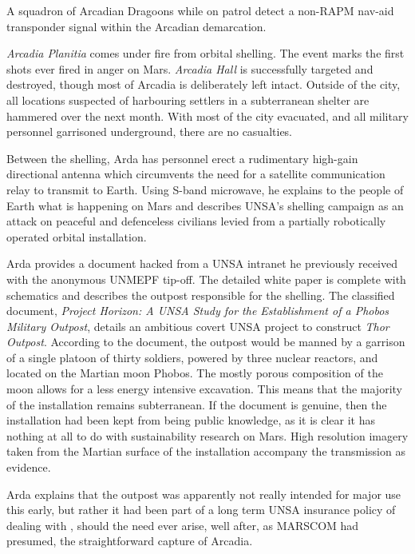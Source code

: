 

A squadron of Arcadian Dragoons while on patrol detect a non-RAPM nav-aid transponder signal within the Arcadian demarcation.
\StopTimelineDate

{\it Arcadia Planitia} comes under fire from orbital shelling. The event marks the first shots ever fired in anger on Mars. {\it Arcadia Hall} is successfully targeted and destroyed, though most of Arcadia is deliberately left intact. Outside of the city, all locations suspected of harbouring settlers in a subterranean shelter are hammered over the next month. With most of the city evacuated, and all military personnel garrisoned underground, there are no casualties.

Between the shelling, Arda has personnel erect a rudimentary high-gain directional antenna which circumvents the need for a satellite communication relay to transmit to Earth. Using S-band microwave, he explains to the people of Earth what is happening on Mars and describes UNSA's shelling campaign as an attack on peaceful and defenceless civilians levied from a partially robotically operated orbital installation.

Arda provides a document hacked from a UNSA intranet he previously received with the anonymous UNMEPF tip-off. The detailed white paper is complete with schematics and describes the outpost responsible for the shelling. The classified document, {\it Project Horizon: A UNSA Study for the Establishment of a Phobos Military Outpost}, details an ambitious covert UNSA project to construct {\it Thor Outpost}. According to the document, the outpost would be manned by a garrison of a single platoon of thirty soldiers, powered by three nuclear reactors, and located on the Martian moon Phobos. The mostly porous composition of the moon allows for a less energy intensive excavation. This means that the majority of the installation remains subterranean. If the document is genuine, then the installation had been kept from being public knowledge, as it is clear it has nothing at all to do with sustainability research on Mars. High resolution imagery taken from the Martian surface of the installation accompany the transmission as evidence.

Arda explains that the outpost was apparently not really intended for major use this early, but rather it had been part of a long term UNSA insurance policy of dealing with , should the need ever arise, well after, as MARSCOM had presumed, the straightforward capture of Arcadia.

